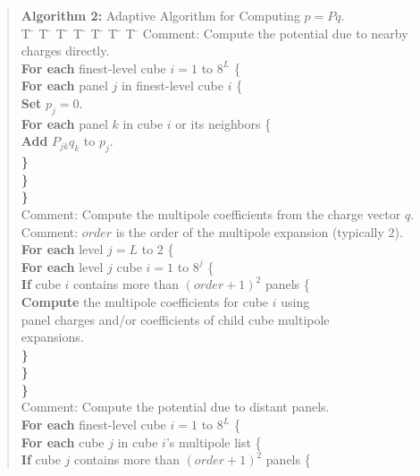 \begin{singlespace}
\begin{quote}
\begin{tabbing}
{\bf Algorithm 2:} Adaptive Algorithm for Computing $ p = P q $.\\
T \= \kill
\>T \= \kill
\>\>T \= \kill
\>\>\>T \= \kill
\>\>\>\>T \= \kill
\>\>\>\>\>T \= \kill
\>\>\>\>\>\>T \= \kill
\> Comment: Compute the potential due to nearby charges directly.\\
\>\> {\bf For each} finest-level cube $ i = 1 $ to $ 8^L $ \{ \\
\>\>\> {\bf For each} panel $ j $ in finest-level cube $ i $ \{ \\
\>\>\>\> {\bf Set} $ p_j = 0 $.\\
\>\>\>\> {\bf For each} panel $ k $ in cube $ i $ or its neighbors \{ \\
\>\>\>\>\> {\bf Add} $ P_{jk} q_k $ to $ p_j $.\\
\>\>\>\> {\bf \}}\\
\>\>\> {\bf \}}\\
\>\> {\bf \}}\\
\> Comment: Compute the multipole coefficients from the charge vector $ q $.\\
\> Comment: $order$ is the order of the multipole expansion (typically 2).\\
\>\> {\bf For each} level $ j = L$ to $2$  \{\\
\>\>\> {\bf For each} level $j $ cube $ i = 1 $ to $ 8^j $ \{\\
\>\>\>\> {\bf If} cube $ i $ contains more than $ (order+1)^2 $ panels \{\\
\>\>\>\>\> {\bf Compute} the multipole coefficients for cube $ i $ using \\
\>\>\>\>\> panel charges and/or coefficients of child cube multipole \\
\>\>\>\>\> expansions.\\
\>\>\>\> {\bf \}}\\
\>\>\> {\bf \}}\\
\>\> {\bf \}}\\
\> Comment: Compute the potential due to distant panels.\\
\>\> {\bf For each} finest-level cube $ i = 1 $ to $ 8^L $ \{\\
\>\>\> {\bf For each} cube $j$ in cube $i$'s multipole list \{\\
\>\>\>\> {\bf If} cube $ j $ contains more than $ (order+1)^2$ panels \{\\

\end{tabbing}
\end{quote}
\end{singlespace}
